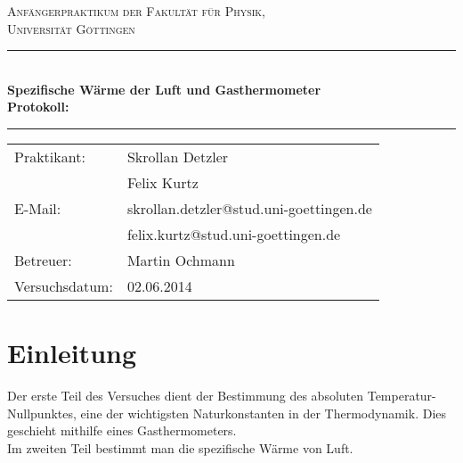 \documentclass[12pt,a4paper,titlepage,headinclude,bibtotoc]{scrartcl}
\begin{document}
\begin{titlepage}
\centering
\textsc{\Large Anfängerpraktikum der Fakultät für
  Physik,\\[1.5ex] Universität Göttingen}

\vspace*{4.2cm}

\rule{\textwidth}{1pt}\\[0.5cm]
{\huge \bfseries
  Spezifische Wärme der Luft und Gasthermometer\\[1.5ex]
  Protokoll:}\\[0.5cm]
\rule{\textwidth}{1pt}

\vspace*{3.0cm}

\begin{Large}
\begin{tabular}{ll}
Praktikant:
	&  Skrollan Detzler\\
 	&  Felix Kurtz\\

  E-Mail: 
	&  skrollan.detzler@stud.uni-goettingen.de\\
	&  felix.kurtz@stud.uni-goettingen.de\\
	

 Betreuer: & Martin Ochmann\\
 Versuchsdatum: & 02.06.2014\\
\end{tabular}
\end{Large}

\vspace*{0.8cm}

\begin{Large}
\end{Large}

\end{titlepage}

\tableofcontents

\newpage

\section{Einleitung}
\label{sec:einleitung}
Der erste Teil des Versuches dient der Bestimmung des absoluten Temperatur-Nullpunktes, eine der wichtigsten Naturkonstanten in der Thermodynamik.
Dies geschieht mithilfe eines Gasthermometers.\\
Im zweiten Teil bestimmt man die spezifische Wärme von Luft.
\end{document}
